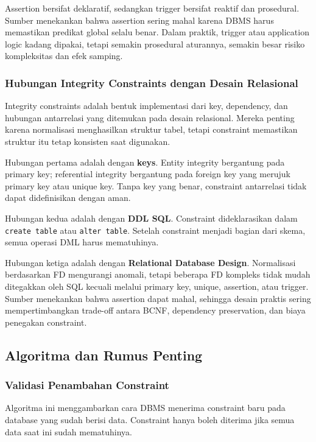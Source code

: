 Assertion bersifat deklaratif, sedangkan trigger bersifat reaktif dan prosedural. Sumber menekankan bahwa assertion sering mahal karena DBMS harus memastikan predikat global selalu benar. Dalam praktik, trigger atau application logic kadang dipakai, tetapi semakin prosedural aturannya, semakin besar risiko kompleksitas dan efek samping.

\subsubsection{Hubungan Integrity Constraints dengan Desain Relasional}

\begin{jawab}
Integrity constraints adalah bentuk implementasi dari key, dependency, dan hubungan antarrelasi yang ditemukan pada desain relasional. Mereka penting karena normalisasi menghasilkan struktur tabel, tetapi constraint memastikan struktur itu tetap konsisten saat digunakan.
\end{jawab}

Hubungan pertama adalah dengan \textbf{keys}. Entity integrity bergantung pada primary key; referential integrity bergantung pada foreign key yang merujuk primary key atau unique key. Tanpa key yang benar, constraint antarrelasi tidak dapat didefinisikan dengan aman.

Hubungan kedua adalah dengan \textbf{DDL SQL}. Constraint dideklarasikan dalam \texttt{create table} atau \texttt{alter table}. Setelah constraint menjadi bagian dari skema, semua operasi DML harus mematuhinya.

Hubungan ketiga adalah dengan \textbf{Relational Database Design}. Normalisasi berdasarkan FD mengurangi anomali, tetapi beberapa FD kompleks tidak mudah ditegakkan oleh SQL kecuali melalui primary key, unique, assertion, atau trigger. Sumber menekankan bahwa assertion dapat mahal, sehingga desain praktis sering mempertimbangkan trade-off antara BCNF, dependency preservation, dan biaya penegakan constraint.

\subsection{Algoritma dan Rumus Penting}

\subsubsection{Validasi Penambahan Constraint}

\begin{jawab}
Algoritma ini menggambarkan cara DBMS menerima constraint baru pada database yang sudah berisi data. Constraint hanya boleh diterima jika semua data saat ini sudah mematuhinya.
\end{jawab}

